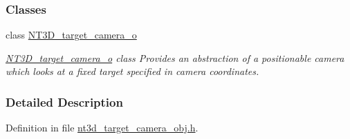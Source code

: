 \subsubsection*{Classes}
\begin{DoxyCompactItemize}
\item 
class \hyperlink{class_n_t3_d__target__camera__o}{NT3D\_\-target\_\-camera\_\-o}
\begin{DoxyCompactList}\small\item\em \hyperlink{class_n_t3_d__target__camera__o}{NT3D\_\-target\_\-camera\_\-o} class Provides an abstraction of a positionable camera which looks at a fixed target specified in camera coordinates. \item\end{DoxyCompactList}\end{DoxyCompactItemize}


\subsubsection{Detailed Description}


Definition in file \hyperlink{nt3d__target__camera__obj_8h_source}{nt3d\_\-target\_\-camera\_\-obj.h}.

